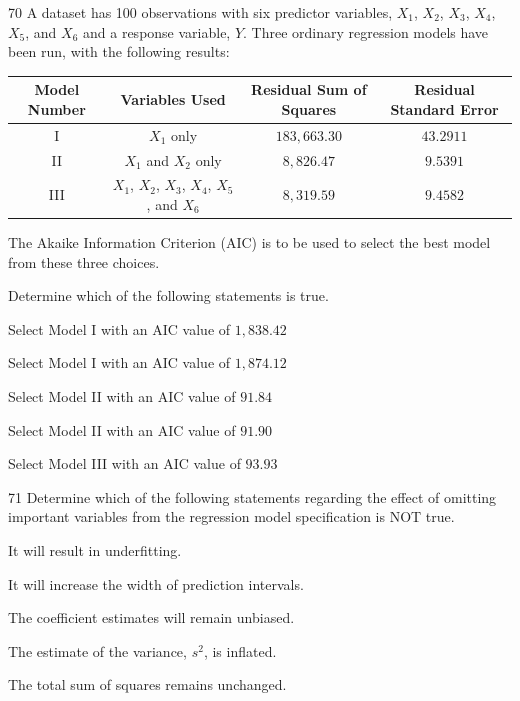 \begin{question}{70}
A dataset has 100 observations with six predictor variables, $X_1$, $X_2$, $X_3$, $X_4$, $X_5$, and $X_6$ and a response variable, $Y$. Three ordinary regression models have been run, with the following results:
\begin{center}
\begin{tabular}{|c|c|c|c|}
\hline
Model Number & Variables Used & Residual Sum of Squares & Residual Standard Error \\ \hline
I & $X_1$ only & $183{,}663.30$ & $43.2911$ \\ \hline
II & $X_1$ and $X_2$ only & $8{,}826.47$ & $9.5391$ \\ \hline
III & $X_1$, $X_2$, $X_3$, $X_4$, $X_5$, and $X_6$ & $8{,}319.59$ & $9.4582$ \\ \hline
\end{tabular}
\end{center}

The Akaike Information Criterion (AIC) is to be used to select the best model from these three choices.

Determine which of the following statements is true.

\begin{choices}
\item Select Model I with an AIC value of $1{,}838.42$
\item Select Model I with an AIC value of $1{,}874.12$
\item Select Model II with an AIC value of $91.84$
\item Select Model II with an AIC value of $91.90$
\item Select Model III with an AIC value of $93.93$
\end{choices}
\end{question}

\begin{question}{71}
Determine which of the following statements regarding the effect of omitting important variables from the regression model specification is NOT true.

\begin{choices}
\item It will result in underfitting.
\item It will increase the width of prediction intervals.
\item The coefficient estimates will remain unbiased.
\item The estimate of the variance, $s^2$, is inflated.
\item The total sum of squares remains unchanged.
\end{choices}
\end{question}

